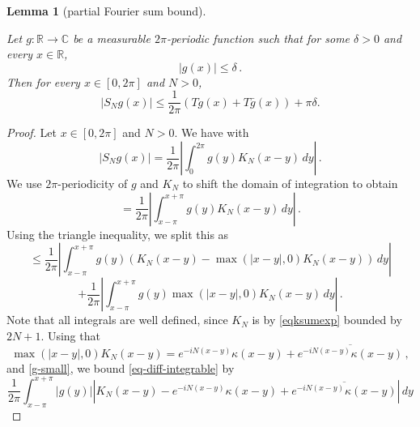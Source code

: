 \documentclass[10pt,a4paper]{article}
\theoremstyle{plain}
\newtheorem{lemma}[theorem]{Lemma}
\theoremstyle{definition}
\numberwithin{equation}{subsection}
\newcommand{\R}{{\mathbb{R}}}
\newcommand{\lean}[1]{}
\newcommand{\uses}[1]{}
\newcommand{\leanok}{}
\def\C{\mathbb{C}}
\begin{document}
\begin{lemma}[partial Fourier sum bound]
    \label{partial-Fourier-sum-bound}
    \uses{Dirichlet-kernel, Dirichlet-Hilbert}
    \leanok
    \lean{partialFourierSum_bound}
    Let $g:\R\to\C$ be a measurable $2\pi$-periodic function such that for some $\delta>0$ and every $x\in\R$,
    \begin{equation}
        |g(x)|\le \delta \,.
    \end{equation}
    Then for every $x\in [0,2\pi]$ and $N>0$,
    \begin{equation*}
        |S_N g(x)| \le \frac{1}{2\pi} (Tg(x) + T\bar{g}(x)) + \pi\delta.
    \end{equation*}
\end{lemma}

\begin{proof}
    \leanok
    Let $x\in [0,2\pi]$ and $N>0$. We have with 
    \begin{equation*}
        |S_N g(x)| = \frac{1}{2\pi} \left| \int_0^{2\pi} g(y) K_N(x-y) \, dy\right|\,.
    \end{equation*}
    We use $2\pi$-periodicity of $g$ and $K_N$ to shift the domain of integration to obtain
    \begin{equation*}
        = \frac{1}{2\pi} \left|\int_{x-\pi}^{x+\pi} g(y) K_N(x-y) \, dy\right|\,.
    \end{equation*}
    Using the triangle inequality, we split this as
    \begin{equation}
        \label{eq-diff-integrable}
        \le \frac{1}{2\pi} \left|\int_{x-\pi}^{x+\pi} g(y) \left(K_N(x-y) - \max(|x-y|,0) K_N(x-y)\right) \, dy \right|
    \end{equation}
    \begin{equation}
        \label{eq-diff-singular}
        + \frac{1}{2\pi} \left|\int_{x-\pi}^{x+\pi} g(y) \max(|x-y|,0) K_N(x-y) \, dy\right|\,.
    \end{equation}
    Note that all integrals are well defined, since $K_N$ is by \eqref{eqksumexp} bounded by $2N+1$.
    Using that
    \begin{equation}
        \label{eq-Dirichlet-Hilbert}
        \max(|x-y|,0) K_N(x-y) = e^{-iN(x-y)}\kappa(x-y) + \overline{e^{-iN(x-y)}\kappa(x-y)} \,,
    \end{equation}
     and \eqref{g-small}, we bound \eqref{eq-diff-integrable} by
    \begin{equation*}
        \frac{1}{2\pi} \int_{x-\pi}^{x+\pi} |g(y)| \left|K_N(x-y) - e^{-iN(x-y)}\kappa(x-y) + \overline{e^{-iN(x-y)}\kappa(x-y)}\right|\, dy

\end{equation*}
\end{proof}
\end{document}
